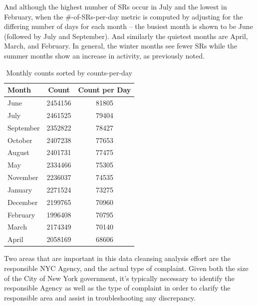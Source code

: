\documentclass[12pt, titlepage]{article}
\begin{document}
And although the highest number of SRs occur in July and the lowest in February,
when the \#-of-SRs-per-day metric is computed by adjusting for the differing number of days for each month -- the
busiest month is shown to be June (followed by July and September). And similarly the quietest months are April, March, and 
February. In general, the winter months see fewer SRs while the summer months show 
an increase in activity, as previously noted.

\begin{table}[ht]
    \centering
    \small
    \begin{tabular}{lS[table-format=7.0]S[table-format=6.0]} %
        \toprule
        \textbf{Month}     & \textbf{Count}   & \textbf{Count per Day} \\ 
        \midrule
        June  & 2454156 & 81805 \\ 
        July  & 2461525 & 79404 \\ 
        September & 2352822 & 78427 \\ 
        October & 2407238 & 77653 \\ 
        August & 2401731 & 77475 \\ 
        May  & 2334466 & 75305 \\ 
        November  & 2236037 & 74535 \\ 
        January   & 2271524 & 73275 \\ 
        December  & 2199765 & 70960 \\ 
        February  & 1996408 & 70795 \\ 
        March & 2174349 & 70140 \\ 
        April  & 2058169 & 68606 \\ 
       \bottomrule
    \end{tabular}
    \caption{Monthly counts sorted by counts-per-day}
    \label{tab:monthly_counts}
\end{table}

\FloatBarrier %

Two areas that are important in this data cleansing analysis effort are the responsible NYC Agency, and the actual type of complaint.
Given both the size of the City of New York government, it's typically necessary to identify the responsible Agency as well as the type of complaint in order to 
clarify the responsible area and assist in troubleshooting any discrepancy.
\end{document}
